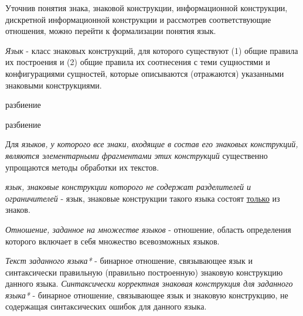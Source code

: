 Уточнив понятия знака, знаковой конструкции, информационной конструкции, дискретной информационной конструкции и рассмотрев соответствующие отношения, можно перейти к формализации понятия язык.

\textit{Язык} - класс знаковых конструкций, для которого существуют (1) общие правила их построения и (2) общие правила их соотнесения с теми сущностями и конфигурациями сущностей, которые описываются (отражаются) указанными знаковыми конструкциями.

\begin{SCn}

    \begin{scnrelfromset}{разбиение}
        \begin{scnindent}
	        \begin{scnrelfromset}{разбиение}
    	    \end{scnrelfromset}
	    \end{scnindent}
    \end{scnrelfromset}

\end{SCn}

Для \textit{языков, у которого все знаки, входящие в состав его знаковых конструкций, являются элементарными фрагментами этих конструкций} существенно упрощаются методы обработки их текстов.

\textit{язык, знаковые конструкции которого не содержат разделителей и ограничителей} - язык, знаковые конструкции такого языка состоят \underline{только} из знаков.

\textit{Отношение, заданное на множестве языков\scnsupergroupsign} - отношение, область определения которого включает в себя множество всевозможных языков.

\textit{Текст заданного языка*} - бинарное отношение, связывающее язык и синтаксически правильную (правильно построенную) знаковую конструкцию данного языка.
\textit{Синтаксически корректная знаковая конструкция для заданного языка*} - бинарное отношение, связывающее язык и знаковую конструкцию, не содержащая синтаксических ошибок для данного языка.

